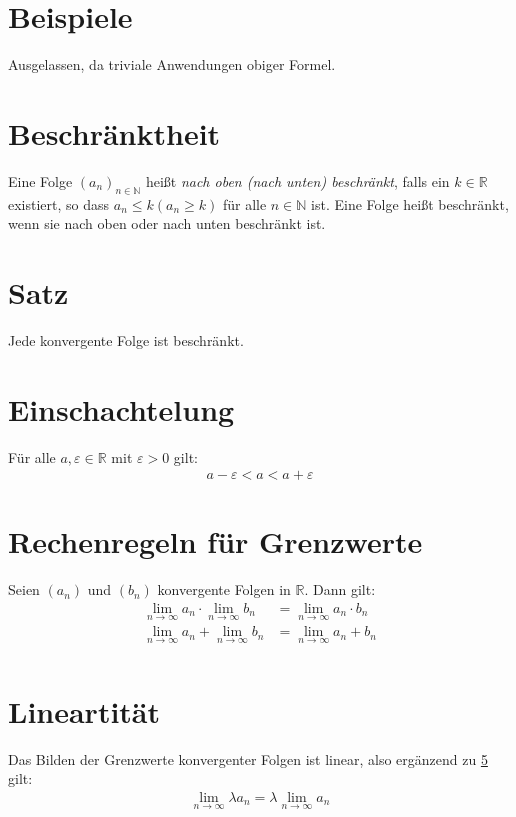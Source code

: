\documentclass{scrreprt}
\newcommand{\NN}{\mathbb{N}}
\newcommand{\RR}{\mathbb{R}}
\begin{document}
    \section{Beispiele}
    Ausgelassen, da triviale Anwendungen obiger Formel.

    \section{Beschränktheit}
    Eine Folge $(a_n)_{n \in \NN}$ heißt \emph{nach oben (nach unten) beschränkt}, falls ein $k \in \RR$ existiert, so dass $a_n \leq k (a_n \geq k)$ für alle $n \in \NN$ ist. Eine Folge heißt beschränkt, wenn sie nach oben oder nach unten beschränkt ist.

    \section{Satz}
    Jede konvergente Folge ist beschränkt.

    \section{Einschachtelung}
    Für alle $a, \varepsilon \in \RR$ mit $\varepsilon > 0$ gilt:
    \begin{align*}
        a-\varepsilon < a < a + \varepsilon
    \end{align*}

    \section{Rechenregeln für Grenzwerte}\label{414}
    Seien $(a_n)$ und $(b_n)$ konvergente Folgen in $\RR$. Dann gilt:
    \begin{align*}
        \lim\limits_{n \to \infty} a_n \cdot \lim\limits_{n \to \infty} b_n &= \lim\limits_{n \to \infty} a_n \cdot b_n\\
        \lim\limits_{n \to \infty} a_n + \lim\limits_{n \to \infty} b_n &= \lim\limits_{n \to \infty} a_n + b_n\\
    \end{align*}

    \section{Lineartität}
    Das Bilden der Grenzwerte konvergenter Folgen ist linear, also ergänzend zu \ref{414} gilt:
    \begin{align*}
        \lim\limits_{n \to \infty} \lambda a_n = \lambda \lim\limits_{n \to \infty} a_n
    \end{align*}
\end{document}
